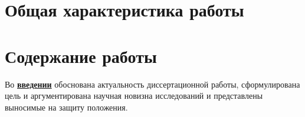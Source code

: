 \section*{Общая характеристика работы}

\newcommand{\actuality}{\pdfbookmark[1]{Актуальность}{actuality}\underline{\textbf{\actualityTXT}}}
\newcommand{\progress}{\pdfbookmark[1]{Разработанность темы}{progress}\underline{\textbf{\progressTXT}}}
\newcommand{\aim}{\pdfbookmark[1]{Цели}{aim}\underline{{\textbf\aimTXT}}}
\newcommand{\tasks}{\pdfbookmark[1]{Задачи}{tasks}\underline{\textbf{\tasksTXT}}}
\newcommand{\aimtasks}{\pdfbookmark[1]{Цели и задачи}{aimtasks}\aimtasksTXT}
\newcommand{\novelty}{\pdfbookmark[1]{Научная новизна}{novelty}\underline{\textbf{\noveltyTXT}}}
\newcommand{\influence}{\pdfbookmark[1]{Практическая значимость}{influence}\underline{\textbf{\influenceTXT}}}
\newcommand{\methods}{\pdfbookmark[1]{Методология и методы исследования}{methods}\underline{\textbf{\methodsTXT}}}
\newcommand{\defpositions}{\pdfbookmark[1]{Положения, выносимые на защиту}{defpositions}\underline{\textbf{\defpositionsTXT}}}
\newcommand{\reliability}{\pdfbookmark[1]{Достоверность}{reliability}\underline{\textbf{\reliabilityTXT}}}
\newcommand{\probation}{\pdfbookmark[1]{Апробация}{probation}\underline{\textbf{\probationTXT}}}
\newcommand{\contribution}{\pdfbookmark[1]{Личный вклад}{contribution}\underline{\textbf{\contributionTXT}}}
\newcommand{\publications}{\pdfbookmark[1]{Публикации}{publications}\underline{\textbf{\publicationsTXT}}}




\section*{Содержание работы}
Во \underline{\textbf{введении}} обоснована актуальность диссертационной работы, сформулирована цель и аргументирована научная новизна исследований и представлены выносимые на защиту положения.


